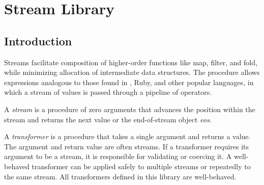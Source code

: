 %
%
%

\chapter {Stream Library}\label{chap:stream}

\section {Introduction}

Streams facilitate composition of higher-order functions like map, filter, and fold, while
minimizing allocation of intermediate data structures. The  procedure allows
expressions analogous to those found in \csharp, Ruby, and other popular languages, in
which a stream of values is passed through a pipeline of operators.

A \emph{stream} is a procedure of zero arguments that advances the position
within the stream and returns the next value or the end-of-stream object \emph{eos}.

A \emph{transformer} is a procedure that takes a single argument and
returns a value.  The argument and return value are often streams. If a transformer
requires its argument to be a stream, it is responsible for validating or coercing it. A
well-behaved transformer can be applied safely to multiple streams or repeatedly to the
same stream. All transformers defined in this library are well-behaved.

